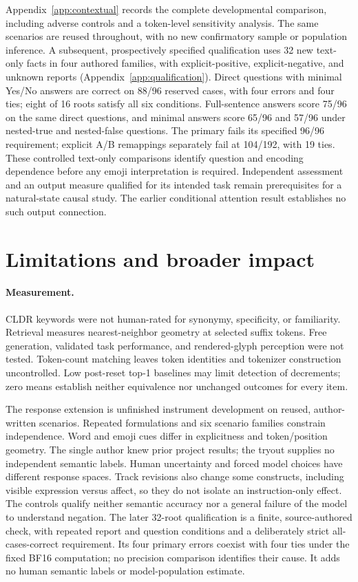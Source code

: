 \documentclass{article}
\begin{document}
Appendix~\ref{app:contextual} records the complete developmental comparison,
including adverse controls and a token-level sensitivity analysis. The same
scenarios are reused throughout, with no new confirmatory sample or population
inference. A subsequent, prospectively specified qualification uses 32 new
text-only facts in four authored families, with explicit-positive,
explicit-negative, and unknown reports (Appendix~\ref{app:qualification}).
Direct questions with minimal Yes/No answers are correct on 88/96 reserved
cases, with four errors and four ties; eight of 16 roots satisfy all six
conditions. Full-sentence answers score 75/96 on the same direct questions,
and minimal answers score 65/96 and 57/96 under nested-true and nested-false
questions. The primary fails its specified 96/96 requirement; explicit A/B
remappings separately fail at 104/192, with 19 ties. These controlled text-only
comparisons identify question and encoding dependence before any emoji
interpretation is required. Independent assessment and an output measure
qualified for its intended task remain prerequisites for a natural-state
causal study. The earlier conditional attention result establishes no such
output connection.

\section{Limitations and broader impact}

\paragraph{Measurement.}
CLDR keywords were not human-rated for synonymy, specificity, or familiarity.
Retrieval measures
nearest-neighbor geometry at selected suffix tokens. Free generation,
validated task performance, and rendered-glyph perception were not tested. Token-count matching
leaves token identities and tokenizer construction uncontrolled.
Low post-reset top-1 baselines may limit detection of decrements; zero means establish
neither equivalence nor unchanged outcomes for every item.

The response extension is unfinished instrument development on reused,
author-written scenarios. Repeated formulations and six scenario families
constrain independence. Word and emoji cues differ in explicitness and
token/position geometry. The single author knew prior project results;
the tryout supplies no independent semantic labels. Human uncertainty and
forced model choices have different response spaces. Track revisions also
change some constructs, including visible expression versus affect, so they
do not isolate an instruction-only effect. The controls qualify neither
semantic accuracy nor a general failure of the model to understand negation.
The later 32-root qualification is a finite, source-authored check, with repeated
report and question conditions and a deliberately strict all-cases-correct
requirement. Its four primary errors coexist with four ties under the fixed
BF16 computation; no precision comparison identifies their cause. It adds
no human semantic labels or model-population estimate.
\end{document}

